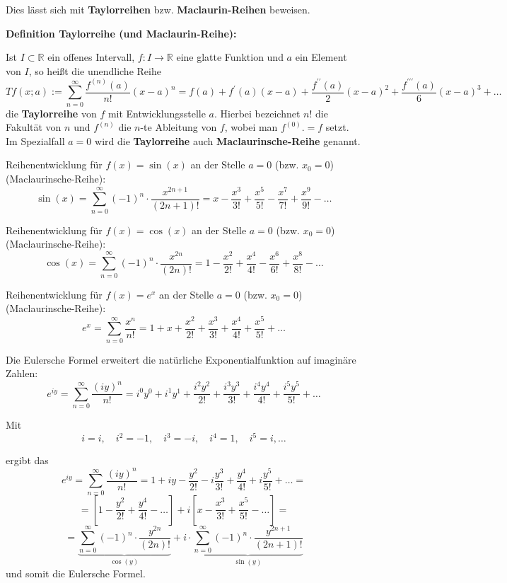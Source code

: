 \documentclass[12pt]{amsart}
\begin{document}
Dies lässt sich mit \textbf{Taylorreihen} bzw. \textbf{Maclaurin-Reihen} beweisen.

\bigskip

\textbf{Definition Taylorreihe (und Maclaurin-Reihe):}

\smallskip

Ist $I \subset \mathbb{R}$ ein offenes Intervall, $f: I \rightarrow \mathbb{R}$ eine glatte Funktion und $a$ ein Element von $I$, so heißt die unendliche Reihe $$Tf(x;a) := \sum_{n = 0}^\infty \frac{f^{(n)}(a)}{n!}(x - a)^n = f(a) + f^\prime(a)(x - a) + \frac{f^{\prime\prime}(a)}{2}(x - a)^2 + \frac{f^{\prime\prime\prime}(a)}{6}(x - a)^3 + \dots$$ die \textbf{Taylorreihe} von $f$ mit Entwicklungsstelle $a$. Hierbei bezeichnet $n!$ die Fakultät von $n$ und $f^{(n)}$ die $n$-te Ableitung von $f$, wobei man $f^{(0)} .= f$ setzt. Im Spezialfall $a = 0$ wird die \textbf{Taylorreihe} auch \textbf{Maclaurinsche-Reihe} genannt.

\bigskip

Reihenentwicklung für $f(x) = \sin{(x)}$ an der Stelle $a = 0$ (bzw. $x_0 = 0$) (Maclaurinsche-Reihe): $$\sin{(x)} = \sum_{n = 0}^\infty (-1)^n \cdot \frac{x^{2n + 1}}{(2n + 1)!} = x - \frac{x^3}{3!} + \frac{x^5}{5!} - \frac{x^7}{7!} + \frac{x^9}{9!} - \dots$$

\smallskip

Reihenentwicklung für $f(x) = \cos{(x)}$ an der Stelle $a = 0$ (bzw. $x_0 = 0$) (Maclaurinsche-Reihe): $$\cos{(x)} = \sum_{n = 0}^\infty (-1)^n \cdot \frac{x^{2n}}{(2n)!} = 1 - \frac{x^2}{2!} + \frac{x^4}{4!} - \frac{x^6}{6!} + \frac{x^8}{8!} - \dots$$

\smallskip

Reihenentwicklung für $f(x) = e^x$ an der Stelle $a = 0$ (bzw. $x_0 = 0$) (Maclaurinsche-Reihe): $$e^x = \sum_{n = 0}^\infty \frac{x^n}{n!} = 1 + x + \frac{x^2}{2!} + \frac{x^3}{3!} + \frac{x^4}{4!} + \frac{x^5}{5!} + \dots$$

\smallskip

Die Eulersche Formel erweitert die natürliche Exponentialfunktion auf imaginäre Zahlen: $$e^{iy} = \sum_{n = 0}^\infty \frac{(iy)^n}{n!} = i^0y^0 + i^1y^1 + \frac{i^2y^2}{2!} + \frac{i^3y^3}{3!} + \frac{i^4y^4}{4!} + \frac{i^5y^5}{5!} + \dots$$

Mit $$i = i, \quad i^2 = -1, \quad i^3 = -i, \quad i^4 = 1, \quad i^5 = i, \dots$$

ergibt das $$e^{iy} = \sum_{n = 0}^\infty \frac{(iy)^n}{n!} = 1 + iy - \frac{y^2}{2!} - i\frac{y^3}{3!} + \frac{y^4}{4!} + i\frac{y^5}{5!} + \dots =$$ 
$$= \left[1 - \frac{y^2}{2!} + \frac{y^4}{4!} - \dots \right] + i \left[x - \frac{x^3}{3!} + \frac{x^5}{5!} - \dots \right] = $$ 
$$=  \underbrace{\sum_{n = 0}^\infty (-1)^n \cdot \frac{y^{2n}}{(2n)!}}_{\cos{(y)}} + i \cdot \underbrace{\sum_{n = 0}^\infty (-1)^n \cdot \frac{y^{2n + 1}}{(2n + 1)!}}_{\sin{(y)}}$$
und somit die Eulersche Formel.
\end{document}

